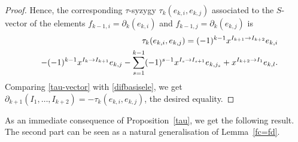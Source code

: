 \documentclass[ALCO]{cedram}
\newcommand{\dif}{\mbox{$\partial$}}
\begin{document}
\begin{proof}
Hence, the corresponding $\tau$-syzygy $\tau_{k}(e_{k,i},e_{k,j})$
associated to the $S$-vector of the elements
$f_{k-1,i}=\dif_{k}(e_{k,i})$ and $f_{k-1,j}=\dif_{k}(e_{k,j})$ is
\begin{eqnarray}\label{tau-vector}
&& \tau_{k}(e_{k,i},e_{k,j})=(-1)^{k-1}x^{I_{k+1}\to
  I_{k+2}}e_{k,i}\\ && - (-1)^{k-1}x^{I_{k}\to
  I_{k+1}}e_{k,j} -\sum_{s=1}^{k-1}(-1)^{s-1}x^{I_s\to
  I_{s+1}}e_{k,j_s}+x^{I_{k+2}\to I_1}e_{k,l}. \notag
\end{eqnarray}
Comparing \eqref{tau-vector} with \eqref{difbasisele}, we get
$\dif_{k+1}(I_1,\ldots,I_{k+2})=-\tau_{k}(e_{k,i},e_{k,j})$, the
desired equality. 
\end{proof}

As an immediate consequence of Proposition~\ref{tau}, we get the
following result. The second part can be seen as a natural
generalisation of Lemma~\ref{fc=fd}.
\end{document}
